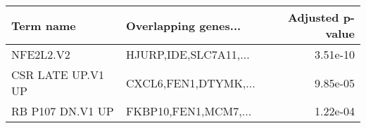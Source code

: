 \begin{tabular}{llr}
\toprule
        Term name &  Overlapping genes... &  Adjusted p-value \\
\midrule
        NFE2L2.V2 & HJURP,IDE,SLC7A11,... &          3.51e-10 \\
CSR LATE UP.V1 UP &  CXCL6,FEN1,DTYMK,... &          9.85e-05 \\
 RB P107 DN.V1 UP &  FKBP10,FEN1,MCM7,... &          1.22e-04 \\
\bottomrule
\end{tabular}
